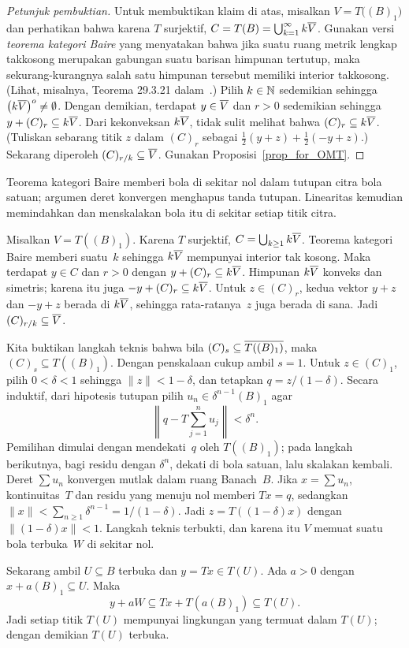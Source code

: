 \begin{o001readerwork}
\begin{o001sourcehint}
\begin{proof}[\emph{Petunjuk pembuktian}]
Untuk membuktikan klaim di atas, misalkan $V = T\bigl((B)_1\bigr)$ dan perhatikan bahwa karena $T$ surjektif, $C = T(B) =
\bigcup_{k=1}^\infty k\overline{V}$.  Gunakan versi \emph{teorema kategori Baire} yang menyatakan bahwa jika suatu ruang metrik lengkap takkosong
merupakan gabungan suatu barisan himpunan tertutup, maka sekurang-kurangnya salah satu himpunan tersebut memiliki interior takkosong.
(Lihat, misalnya, Teorema 29.3.21 dalam~\cite{Erdman:2007}.)  Pilih $k \in \mathbb{N}$ sedemikian sehingga $\bigl(k\overline{V}\bigr)^o \neq \emptyset$.
Dengan demikian, terdapat $y \in \overline{V}$ dan $r > 0$ sedemikian sehingga $y + (C)_r \subseteq k\overline{V}$.  Dari kekonveksan
$k\overline{V}$, tidak sulit melihat bahwa $(C)_r \subseteq k\overline{V}$.  (Tuliskan sebarang titik $z$ dalam $(C)_r$ sebagai
$\frac12(y + z) + \frac12(-y + z)$.) Sekarang diperoleh $(C)_{r/k} \subseteq \overline{V}$.  Gunakan Proposisi~\ref{prop_for_OMT}.
\ns \end{proof}
\end{o001sourcehint}
\begin{o001answer}
Teorema kategori Baire memberi bola di sekitar nol dalam tutupan citra bola
satuan; argumen deret konvergen menghapus tanda tutupan. Linearitas kemudian
memindahkan dan menskalakan bola itu di sekitar setiap titik citra.
\end{o001answer}
\begin{o001proof}
Misalkan $V=T((B)_1)$. Karena $T$ surjektif,
$C=\bigcup_{k\geq1}k\overline{V}$. Teorema kategori Baire memberi suatu~$k$ sehingga
$k\overline{V}$ mempunyai interior tak kosong. Maka terdapat $y\in C$ dan $r>0$
dengan $y+(C)_r\subseteq k\overline{V}$. Himpunan $k\overline{V}$ konveks dan simetris;
karena itu juga $-y+(C)_r\subseteq k\overline{V}$. Untuk $z\in(C)_r$, kedua vektor
$y+z$ dan $-y+z$ berada di $k\overline{V}$, sehingga rata-ratanya~$z$ juga berada
di sana. Jadi $(C)_{r/k}\subseteq\overline{V}$.

Kita buktikan langkah teknis bahwa bila $(C)_s\subseteq\overline{T((B)_1)}$, maka
$(C)_s\subseteq T((B)_1)$. Dengan penskalaan cukup ambil $s=1$. Untuk
$z\in(C)_1$, pilih $0<\delta<1$ sehingga $\|z\|<1-\delta$, dan tetapkan
$q=z/(1-\delta)$. Secara induktif, dari hipotesis tutupan pilih
$u_n\in\delta^{n-1}(B)_1$ agar
\[
 \left\|q-T\sum_{j=1}^{n}u_j\right\|<\delta^n.
\]
Pemilihan dimulai dengan mendekati~$q$ oleh $T((B)_1)$; pada langkah
berikutnya, bagi residu dengan $\delta^n$, dekati di bola satuan, lalu
skalakan kembali. Deret $\sum u_n$ konvergen mutlak dalam ruang Banach~$B$.
Jika $x=\sum u_n$, kontinuitas~$T$ dan residu yang menuju nol memberi
$Tx=q$, sedangkan $\|x\|<\sum_{n\geq1}\delta^{n-1}=1/(1-\delta)$.
Jadi $z=T((1-\delta)x)$ dengan $\|(1-\delta)x\|<1$. Langkah teknis terbukti,
dan karena itu $V$ memuat suatu bola terbuka~$W$ di sekitar nol.

Sekarang ambil $U\subseteq B$ terbuka dan $y=Tx\in T(U)$. Ada $a>0$ dengan
$x+a(B)_1\subseteq U$. Maka
\[
 y+aW\subseteq Tx+T(a(B)_1)\subseteq T(U).
\]
Jadi setiap titik $T(U)$ mempunyai lingkungan yang termuat dalam $T(U)$;
dengan demikian $T(U)$ terbuka.
\end{o001proof}
\end{o001readerwork}

